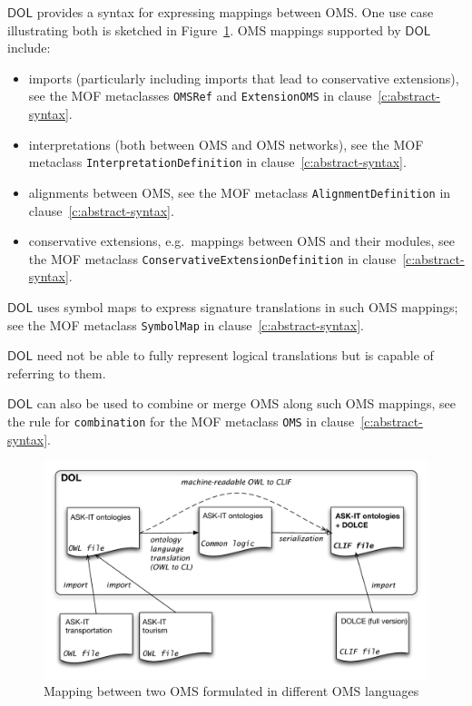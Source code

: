 \documentclass[10pt,fleqn,final]{scrreprt}
\newcommand*{\syntax}[1]{\texttt{#1}}
\newcommand*{\DOL}{\ensuremath{\mathsf{DOL}}\xspace}
\newcommand{\figurerefname}{Figure}
\newcommand{\fref}[1]{\figurerefname~\ref{#1}}
\newenvironment{definitions}[0]{\medskip }{}
\begin{document}
\begin{definitions}
\DOL provides a syntax for expressing mappings between OMS.  One use case illustrating both is sketched in  \fref{f:DOL-mapping}.  OMS mappings supported by \DOL include:
\begin{itemize}
\item imports (particularly including imports that lead to conservative extensions), see the
 MOF metaclasses   \syntax{OMSRef} and \syntax{ExtensionOMS} in
clause~\ref{c:abstract-syntax}.
\item interpretations (both between OMS and OMS networks), see the
 MOF metaclass   \syntax{InterpretationDefinition} in
clause~\ref{c:abstract-syntax}.
\item alignments between OMS, see the
 MOF metaclass   \syntax{AlignmentDefinition} in
clause~\ref{c:abstract-syntax}.
\item conservative extensions, e.g.\ mappings between OMS and their modules, see the
 MOF metaclass   \syntax{ConservativeExtensionDefinition} in
clause~\ref{c:abstract-syntax}.
\end{itemize}
\DOL uses symbol maps to express signature translations in such OMS mappings; see the
 MOF metaclass   \syntax{SymbolMap} in
clause~\ref{c:abstract-syntax}.

\DOL need not be able to fully represent logical translations but is
capable of referring to them.

\DOL can also be used to combine or merge OMS along such OMS mappings, see
the rule for \syntax{combination} for the  MOF metaclass  
\syntax{OMS} in clause~\ref{c:abstract-syntax}.

\begin{figure}
  \centering
  \includegraphics[width=\textwidth]{illustrations/DOLfig.pdf}
  \caption{Mapping between two OMS formulated in different OMS languages}
\label{f:DOL-mapping}
\end{figure}




\end{definitions}
\end{document}
